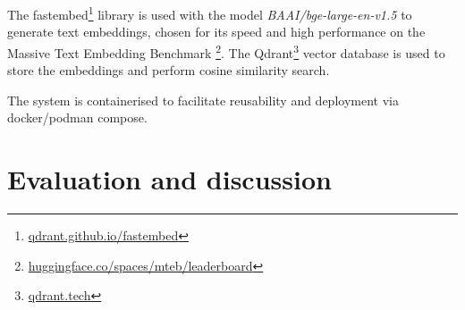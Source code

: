 \documentclass[
]{ceurart}
\begin{document}
The fastembed\footnote{\href{https://qdrant.github.io/fastembed/}{qdrant.github.io/fastembed}} library is used with the model \textit{BAAI/bge-large-en-v1.5} to generate text embeddings, chosen for its speed and high performance on the Massive Text Embedding Benchmark  \cite{muennighoff2022mteb}\cite{excoffier2024generalist}\footnote{\href{https://huggingface.co/spaces/mteb/leaderboard}{huggingface.co/spaces/mteb/leaderboard}}. The Qdrant\footnote{\href{https://qdrant.tech/}{qdrant.tech}} vector database is used to store the embeddings and perform cosine similarity search. 





The system is containerised to facilitate reusability and deployment via docker/podman compose.


\section{Evaluation and discussion}

\end{document}
